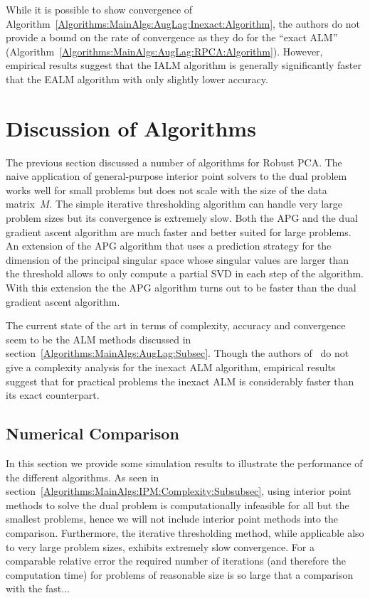 \documentclass{../../common/projectreport}
\begin{document}
While it is possible to show convergence of Algorithm~\ref{Algorithms:MainAlgs:AugLag:Inexact:Algorithm}, the authors do not provide a bound on the rate of convergence as they do for the ``exact ALM'' (Algorithm~\ref{Algorithms:MainAlgs:AugLag:RPCA:Algorithm}). However, empirical results suggest that the IALM algorithm is generally significantly faster that the EALM algorithm with only slightly lower accuracy. 



\section{Discussion of Algorithms}
\label{Algorithms:Discussion:Sec}

The previous section discussed a number of algorithms for Robust PCA. The naive application of general-purpose interior point solvers to the dual problem works well for small problems but does not scale with the size of the data matrix~$M$. The simple iterative thresholding algorithm can handle very large problem sizes but its convergence is extremely slow. Both the APG and the dual gradient ascent algorithm are much faster and better suited for large problems. An extension of the APG algorithm that uses a prediction strategy for the dimension of the principal singular space whose singular values are larger than the threshold allows to only compute a partial SVD in each step of the algorithm. With this extension the the APG algorithm turns out to be faster than the dual gradient ascent algorithm. 

The current state of the art in terms of complexity, accuracy and convergence seem to be the ALM methods discussed in section~\ref{Algorithms:MainAlgs:AugLag:Subsec}. Though the authors of~\cite{Lin:2010fk} do not give a complexity analysis for the inexact ALM algorithm, empirical results suggest that for practical problems the inexact ALM is considerably faster than its exact counterpart. 



\subsection{Numerical Comparison}
\label{Algorithms:Discussion:NumComp:Subsec}

In this section we provide some simulation results to illustrate the performance of the different algorithms. As seen in section~\ref{Algorithms:MainAlgs:IPM:Complexity:Subsubsec}, using interior point methods to solve the dual problem is computationally infeasible for all but the smallest problems, hence we will not include interior point methods into the comparison. Furthermore, the iterative thresholding method, while applicable also to very large problem sizes, exhibits extremely slow convergence. For a comparable relative error the required number of iterations (and therefore the computation time) for problems of reasonable size is so large that a comparison with the fast...
\end{document}
